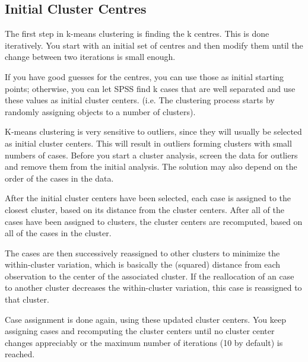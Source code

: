 \documentclass[a4paper,12pt]{article}
\begin{document}
\subsection{Initial Cluster Centres}
The first step in k-means clustering is finding the k centres. This is done iteratively. You start with an initial set of centres and then modify them until the change between two iterations is small enough.

If you have good guesses for the centres, you can use those
as initial starting points; otherwise, you can let SPSS find k cases that are well separated and use these values as initial cluster centers. (i.e. The clustering process starts by randomly assigning objects to a number of
clusters).



K-means clustering is very sensitive to outliers, since they will usually be selected as initial cluster centers. This will result in outliers forming clusters with small numbers of cases. Before you start a cluster analysis, screen the data for outliers and remove them from the initial analysis. The solution may also depend on the order of the cases in the data.

After the initial cluster centers have been selected, each case is assigned to the closest
cluster, based on its distance from the cluster centers. After all of the cases have been
assigned to clusters, the cluster centers are recomputed, based on all of the cases in the
cluster.

The cases are then successively reassigned to other clusters to minimize the within-cluster variation, which is basically the (squared) distance from each observation to the center of the associated cluster. If the reallocation of an case to another cluster decreases the within-cluster variation, this case is reassigned
to that cluster.

Case assignment is done again, using these updated cluster centers. You keep
assigning cases and recomputing the cluster centers until no cluster center changes
appreciably or the maximum number of iterations (10 by default) is reached.
\newpage
\end{document}
